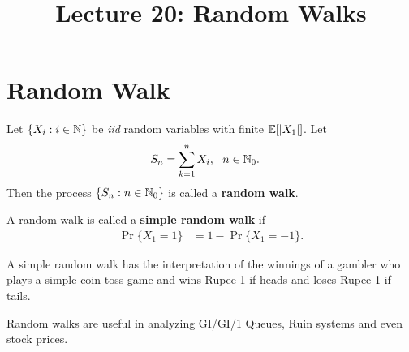\documentclass[a4paper,10pt,english]{article}
\title{Lecture 20: Random Walks}
\author{}
\begin{document}
\maketitle
\section{Random Walk}
\begin{defn} Let $\{X_i: i \in \mathbb{N}\}$ be \textit{iid} random variables with finite $\mathbb{E}[|X_1|]$. Let
\begin{align*}
S_n &= \sum_{k=1}^n X_i, ~~n \in \mathbb{N}_0.
\end{align*}
Then the process $\{S_n: n \in \mathbb{N}_0\}$ is called a \textbf{random walk}. 
\end{defn}
\begin{defn} A random walk is called a \textbf{simple random walk} if
\begin{align*}
\Pr\{X_1 = 1\} &= 1- \Pr\{X_1 = -1\}.
\end{align*}
\end{defn}
\begin{rem} A simple random walk has the interpretation of the winnings of a gambler who plays a simple coin toss game and wins Rupee 1 if heads and loses Rupee 1 if tails. 
\end{rem}
\begin{rem} Random walks are useful in analyzing GI/GI/1 Queues, Ruin systems and even stock prices.
\end{rem}
\end{document}
